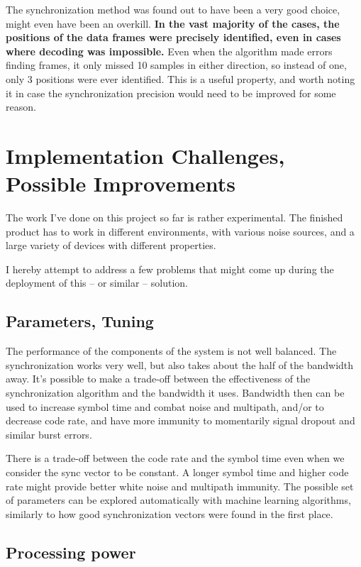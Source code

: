 \documentclass[a4paper]{article}
\begin{document}
The synchronization method was found out to have been a very good 
choice, might even have been an overkill. \textbf{In the vast majority 
of the cases, the positions of the data frames were precisely 
identified, even in cases where decoding was impossible.} Even when the 
algorithm made errors finding frames, it only missed 10 samples in 
either direction, so instead of one, only 3 positions were ever 
identified. This is a useful property, and worth noting it in case the
synchronization precision would need to be improved for some reason.

\section{Implementation Challenges, Possible Improvements}

The work I've done on this project so far is rather experimental. The 
finished product has to work in different environments, with various
noise sources, and a large variety of devices with different
properties.

I hereby attempt to address a few problems that might come up during 
the deployment of this -- or similar -- solution.

\subsection{Parameters, Tuning}

The performance of the components of the system is not well balanced.
The synchronization works very well, but also takes about the half of
the bandwidth away. It's possible to make a trade-off between the
effectiveness of the synchronization algorithm and the bandwidth it
uses. Bandwidth then can be used to increase symbol time and combat
noise and multipath, and/or to decrease code rate, and have more
immunity to momentarily signal dropout and similar burst errors.

There is a trade-off between the code rate and the symbol time even when
we consider the sync vector to be constant. A longer symbol time and
higher code rate might provide better white noise and multipath
immunity. The possible set of parameters can be explored automatically
with machine learning algorithms, similarly to how good synchronization
vectors were found in the first place.

\subsection{Processing power}
\end{document}
